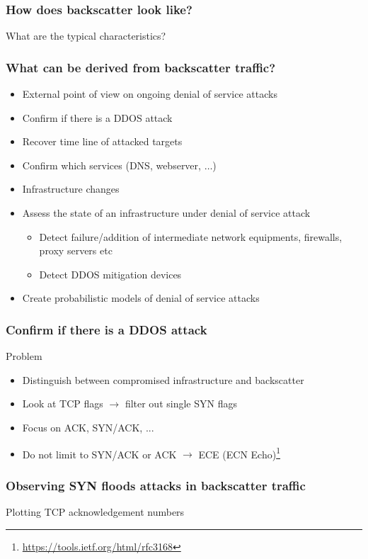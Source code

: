\documentclass{beamer}
\begin{document}
\begin{frame}
\frametitle{How does backscatter look like?}

\begin{center}
    \alert{What are the typical characteristics?}
\end{center}
\end{frame}

\begin{frame}
\frametitle{What can be derived from backscatter traffic?}

\begin{itemize}
    \item External point of view on ongoing denial of service attacks
    \item Confirm if there is a DDOS attack
    \item Recover time line of attacked targets
    \item Confirm which services (DNS, webserver, $\dots$)
    \item Infrastructure changes
    \item Assess the state of an infrastructure under denial of service attack
    \begin{itemize}
        \item Detect failure/addition of  intermediate network equipments, firewalls, proxy servers etc
        \item Detect DDOS mitigation devices
    \end{itemize}
    \item Create probabilistic models of denial of service attacks
\end{itemize}
\end{frame}

\begin{frame}
    \frametitle{Confirm if there is a DDOS attack}
    \begin{block}{Problem}
        \begin{itemize}
            \item Distinguish between compromised infrastructure and backscatter
            \item Look at TCP flags $\to$ filter out single SYN flags
            \item Focus on ACK, SYN/ACK, ...
            \item Do not limit to SYN/ACK or ACK $\to$ ECE (ECN Echo)\footnote{\url{https://tools.ietf.org/html/rfc3168}}
        \end{itemize}
    \end{block}
    
\end{frame}

\begin{frame}
    \frametitle{Observing SYN floods attacks in backscatter traffic}
    Plotting TCP acknowledgement numbers
    \begin{center}
        \scalebox{0.7}{}
    \end{center}
\end{frame}
\end{document}
